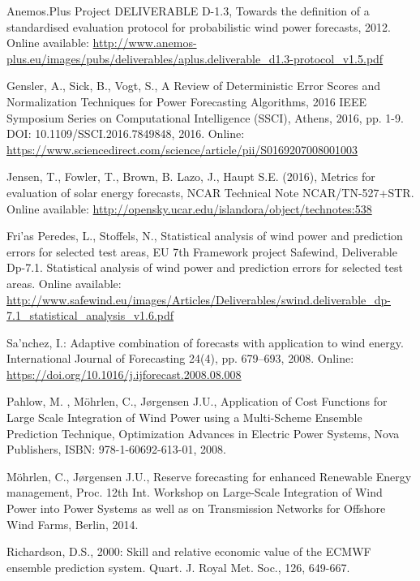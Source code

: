 \begin{thebibliography}{27}
Anemos.Plus Project DELIVERABLE D-1.3, Towards the definition of a standardised evaluation protocol for probabilistic wind power forecasts, 2012. \\
Online available: \url{http://www.anemos-plus.eu/images/pubs/deliverables/aplus.deliverable_d1.3-protocol_v1.5.pdf}

Gensler, A., Sick, B., Vogt, S., A Review of Deterministic Error Scores and Normalization Techniques for Power Forecasting Algorithms, 2016 IEEE Symposium Series on Computational Intelligence (SSCI), Athens, 2016, pp. 1-9. DOI: 10.1109/SSCI.2016.7849848, 2016. Online: \url{https://www.sciencedirect.com/science/article/pii/S0169207008001003}

Jensen, T., Fowler, T., Brown, B. Lazo, J., Haupt S.E. (2016), Metrics for evaluation of solar energy forecasts, NCAR Technical Note NCAR/TN-527+STR. Online available: \url{http://opensky.ucar.edu/islandora/object/technotes:538}

Fri\a'as Peredes, L., Stoffels, N., Statistical analysis of wind power and prediction errors for selected test areas, EU 7th Framework project Safewind, Deliverable Dp-7.1. Statistical analysis of wind power and prediction errors for selected test areas. Online available: \url{http://www.safewind.eu/images/Articles/Deliverables/swind.deliverable_dp-7.1_statistical_analysis_v1.6.pdf}

Sa\a'nchez, I.: Adaptive combination of forecasts with application to wind energy. International Journal of Forecasting 24(4), pp. 679–693, 2008. Online: \url{https://doi.org/10.1016/j.ijforecast.2008.08.008}

Pahlow, M. , M{\"o}hrlen, C., J{\o}rgensen J.U., Application of Cost Functions for Large Scale Integration of Wind Power using a Multi-Scheme Ensemble Prediction Technique, Optimization Advances in Electric Power Systems, Nova Publishers, ISBN: 978-1-60692-613-01, 2008. 

M{\"o}hrlen, C., J{\o}rgensen J.U., Reserve forecasting for enhanced Renewable Energy management, Proc. 12th Int. Workshop on Large-Scale Integration of Wind Power into Power Systems as well as on Transmission Networks for Offshore Wind Farms, Berlin, 2014.

Richardson, D.S., 2000: Skill and relative economic value of the ECMWF ensemble prediction system. Quart. J. Royal Met. Soc., 126, 649-667.


\end{thebibliography}
